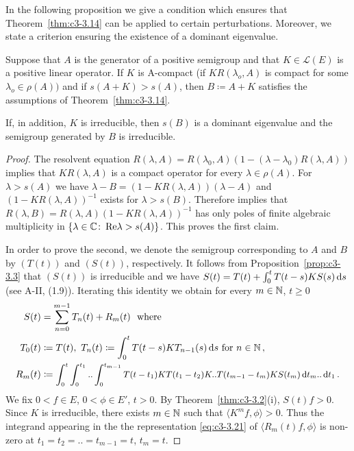 In the following proposition we give a condition which ensures that Theorem~\ref{thm:c3-3.14} can be applied to certain perturbations. 
Moreover, we state a criterion ensuring the existence of a dominant eigenvalue.
\begin{proposition}\label{prop:c3-3.18}
	Suppose that $A$ is the generator of a positive semigroup and that $K \in \mathcal{L}(E)$ is a positive linear operator.
	If $K$ is A-compact (\ie  if $KR(\lambda_{o},A)$ is compact for some $\lambda_{o} \in \rho(A))$ and if $s(A+K) > s(A)$, then $B \coloneqq  A + K$ satisfies the assumptions of Theorem~\ref{thm:c3-3.14}.
	
	If, in addition, $K$ is irreducible, then $s(B)$ is a dominant eigenvalue and the semigroup generated by $B$ is irreducible.
\end{proposition}
\begin{proof}
The resolvent equation $R(\lambda,A) = R(\lambda_{0},A)(1 - (\lambda-\lambda_{0})R(\lambda,A))$ implies that $KR(\lambda,A)$ is a compact operator for every $\lambda \in \rho(A)$. 
For $\lambda > s(A)$ we have $\lambda - B = (1 - KR(\lambda,A))(\lambda-A)$ and $(1 - KR(\lambda,A))^{-1}$ exists for $\lambda > s(B)$.
Therefore \citet[Theorem XIII.13]{reedsimon:1979} 
implies that $R(\lambda,B) = R(\lambda,A)(1 - KR(\lambda,A))^{-1}$ has only poles of finite algebraic multiplicity in $\{\lambda \in \mathbb{C}  \colon \mathop{}\!\mathrm{Re} \lambda > s(A)\}$. 
This proves the first claim.

In order to prove the second, we denote the semigroup corresponding to $A$ and $B$ by $(T(t))$ and $(S(t))$,  respectively.
It follows from Proposition~\ref{prop:c3-3.3} that $(S(t))$ is irreducible and we have $S(t) = T(t) + \int_{0}^{t} T(t-s)KS(s)\mathop{}\!\mathrm{d}{s}$ (see A-II, (1.9)). 
Iterating this identity we obtain for every $m \in \mathbb{N}$, $t \geq 0$
\begin{align}\label{eq:c3-3.21}
    S(t) &= \sum_{n=0}^{m-1} T_{n}(t) + R_{m}(t) \ \text{ where}\\\notag
    T_{0}(t)&\coloneqq T(t),\  T_{n}(t) \coloneqq  \int_{0}^{t} T(t-s)KT_{n-1}(s)\mathop{}\!\mathrm{d}{s} \text{ for } n \in \mathbb{N}\,,\\\notag
    R_{m}(t) &\coloneqq \textit{\small $\int_{0}^{t}\int_{0}^{t_{1}} .. \int_{0}^{t_{m-1}} T(t-t_{1})KT(t_{1}-t_{2})K .. T(t_{m-1}-t_m)KS(t_{m})\mathop{}\!\mathrm{d}{t} _{m}..\mathop{}\!\mathrm{d}{t} _{1}$}\,.
\end{align}
We fix $0 < f \in E$, $0 < \phi \in E'$, $t > 0$. 
By Theorem~\ref{thm:c3-3.2}(i), $S(t)f > 0$.
Since $K$ is irreducible, there exists $m \in \mathbb{N}$ such that $\langle K^{m}f,\phi\rangle > 0$. 
Thus the integrand appearing in the the representation \eqref{eq:c3-3.21} of $\langle R_{m}(t)f,\phi\rangle$ is non-zero at $t_{1}=t_{2}= .. =t_{m-1}=t$, $t_{m}= t$.


\end{proof}
